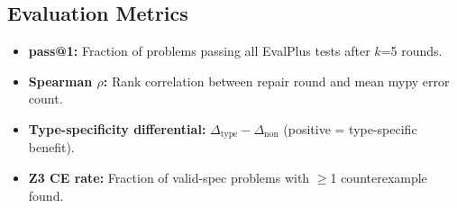 \subsection{Evaluation Metrics}

\begin{itemize}
\item \textbf{pass@1:} Fraction of problems passing all EvalPlus tests after
$k$=5 rounds.
\item \textbf{Spearman $\rho$:} Rank correlation between repair round and mean
mypy error count.
\item \textbf{Type-specificity differential:}
$\Delta_{\text{type}} - \Delta_{\text{non}}$ (positive = type-specific benefit).
\item \textbf{Z3 CE rate:} Fraction of valid-spec problems with $\geq$1
counterexample found.
\end{itemize}
